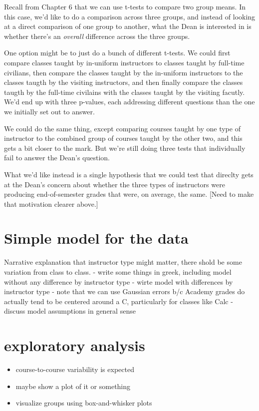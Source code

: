 \documentclass[]{book}
\providecommand{\tightlist}{%
  \setlength{\itemsep}{0pt}\setlength{\parskip}{0pt}}
\theoremstyle{definition}
\theoremstyle{definition}
\theoremstyle{definition}
\theoremstyle{remark}
\begin{document}
Recall from Chapter 6 that we can use t-tests to compare two group
means. In this case, we'd like to do a comparison across three groups,
and instead of looking at a direct comparison of one group to another,
what the Dean is interested in is whether there's an \emph{overall}
difference across the three groups.

One option might be to just do a bunch of different t-tests. We could
first compare classes taught by in-uniform instructors to classes taught
by full-time civilians, then compare the classes taught by the
in-uniform instructors to the classes taugth by the visiting
instructors, and then finally compare the classes taugth by the
full-time civilains with the classes taught by the visiting facutly.
We'd end up with three p-values, each addressing different questions
than the one we initially set out to answer.

We could do the same thing, except comparing courses taught by one type
of instructor to the combined group of courses taught by the other two,
and this gets a bit closer to the mark. But we're still doing three
tests that individually fail to answer the Dean's question.

What we'd like instead is a single hypothesis that we could test that
direclty gets at the Dean's concern about whether the three types of
instructors were producing end-of-semester grades that were, on average,
the same. {[}Need to make that motivation clearer above.{]}

\chapter{Simple model for the data}\label{simple-model-for-the-data}

Narrative explanation that instructor type might matter, there shold be
some variation from class to class. - write some things in greek,
including model without any difference by instructor type - wirte model
with differences by instructor type - note that we can use Gaussian
errors b/c Academy grades do actually tend to be centered around a C,
particularly for classes like Calc - discuss model assumptions in
general sense

\chapter{exploratory analysis}\label{exploratory-analysis}

\begin{itemize}
\tightlist
\item
  course-to-course variability is expected
\item
  maybe show a plot of it or something
\item
  visualize groups using box-and-whisker plots
\end{itemize}
\end{document}
